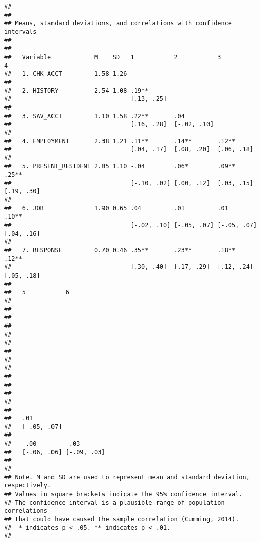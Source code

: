 \documentclass[
]{article}
\begin{document}
\begin{verbatim}
## 
## 
## Means, standard deviations, and correlations with confidence intervals
##  
## 
##   Variable            M    SD   1           2           3           4         
##   1. CHK_ACCT         1.58 1.26                                               
##                                                                               
##   2. HISTORY          2.54 1.08 .19**                                         
##                                 [.13, .25]                                    
##                                                                               
##   3. SAV_ACCT         1.10 1.58 .22**       .04                               
##                                 [.16, .28]  [-.02, .10]                       
##                                                                               
##   4. EMPLOYMENT       2.38 1.21 .11**       .14**       .12**                 
##                                 [.04, .17]  [.08, .20]  [.06, .18]            
##                                                                               
##   5. PRESENT_RESIDENT 2.85 1.10 -.04        .06*        .09**       .25**     
##                                 [-.10, .02] [.00, .12]  [.03, .15]  [.19, .30]
##                                                                               
##   6. JOB              1.90 0.65 .04         .01         .01         .10**     
##                                 [-.02, .10] [-.05, .07] [-.05, .07] [.04, .16]
##                                                                               
##   7. RESPONSE         0.70 0.46 .35**       .23**       .18**       .12**     
##                                 [.30, .40]  [.17, .29]  [.12, .24]  [.05, .18]
##                                                                               
##   5           6          
##                          
##                          
##                          
##                          
##                          
##                          
##                          
##                          
##                          
##                          
##                          
##                          
##                          
##                          
##   .01                    
##   [-.05, .07]            
##                          
##   -.00        -.03       
##   [-.06, .06] [-.09, .03]
##                          
## 
## Note. M and SD are used to represent mean and standard deviation, respectively.
## Values in square brackets indicate the 95% confidence interval.
## The confidence interval is a plausible range of population correlations 
## that could have caused the sample correlation (Cumming, 2014).
##  * indicates p < .05. ** indicates p < .01.
## 
\end{verbatim}
\end{document}
